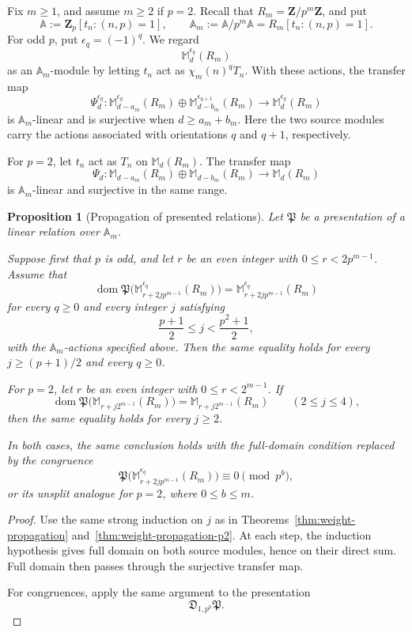 \documentclass[11pt]{article}
\theoremstyle{plain}
\newtheorem{proposition}[theorem]{Proposition}
\theoremstyle{definition}
\theoremstyle{remark}
\numberwithin{equation}{section}
\begin{document}
Fix \(m\geq1\), and assume \(m\geq2\) if \(p=2\). Recall that \(R_m=\mathbf Z/p^m\mathbf Z\), and put \[ \mathbb A:=\mathbf Z_p[t_n:(n,p)=1], \qquad \mathbb A_m:=\mathbb A/p^m\mathbb A =R_m[t_n:(n,p)=1]. \] For odd \(p\), put \(\epsilon_q=(-1)^q\). We regard \[ \mathbb M_d^{\epsilon_q}(R_m) \] as an \(\mathbb A_m\)-module by letting \(t_n\) act as \(\chi_m(n)^qT_n\). With these actions, the transfer map \[ \Psi_d^{\epsilon_q}: \mathbb M_{d-a_m}^{\epsilon_q}(R_m) \oplus \mathbb M_{d-b_m}^{\epsilon_{q+1}}(R_m) \longrightarrow \mathbb M_d^{\epsilon_q}(R_m) \] is \(\mathbb A_m\)-linear and is surjective when \(d\geq a_m+b_m\). Here the two source modules carry the actions associated with orientations \(q\) and \(q+1\), respectively. 

For \(p=2\), let \(t_n\) act as \(T_n\) on \(\mathbb M_d(R_m)\). The transfer map \[ \Psi_d: \mathbb M_{d-a_m}(R_m)\oplus\mathbb M_{d-b_m}(R_m) \longrightarrow\mathbb M_d(R_m) \] is \(\mathbb A_m\)-linear and surjective in the same range. 

\begin{proposition}[Propagation of presented relations] \label{prop:presented-relation-propagation} Let \(\mathfrak P\) be a presentation of a linear relation over \(\mathbb A_m\).
     
Suppose first that \(p\) is odd, and let \(r\) be an even integer with \(0\leq r<2p^{m-1}\). Assume that \[ \operatorname{dom}\mathfrak P \bigl(\mathbb M_{r+2jp^{m-1}}^{\epsilon_q}(R_m)\bigr) = \mathbb M_{r+2jp^{m-1}}^{\epsilon_q}(R_m) \] for every \(q\geq0\) and every integer \(j\) satisfying \[ \frac{p+1}{2}\leq j<\frac{p^2+1}{2}, \] with the \(\mathbb A_m\)-actions specified above. Then the same equality holds for every \(j\geq(p+1)/2\) and every \(q\geq0\).

For \(p=2\), let \(r\) be an even integer with \(0\leq r<2^{m-1}\). If \[ \operatorname{dom}\mathfrak P \bigl(\mathbb M_{r+j2^{m-1}}(R_m)\bigr) = \mathbb M_{r+j2^{m-1}}(R_m) \qquad(2\leq j\leq4), \] then the same equality holds for every \(j\geq2\). 

In both cases, the same conclusion holds with the full-domain condition replaced by the congruence \[ \mathfrak P \bigl(\mathbb M_{r+2jp^{m-1}}^{\epsilon_q}(R_m)\bigr) \equiv0\pmod{p^b}, \] or its unsplit analogue for \(p=2\), where \(0\leq b\leq m\).
\end{proposition}

\begin{proof} Use the same strong induction on \(j\) as in Theorems~\ref{thm:weight-propagation} and~\ref{thm:weight-propagation-p2}. At each step, the induction hypothesis gives full domain on both source modules, hence on their direct sum. Full domain then passes through the surjective transfer map. 

For congruences, apply the same argument to the presentation \[ \mathfrak D_{1,p^b}\mathfrak P. \] 
\end{proof}  
\end{document}
